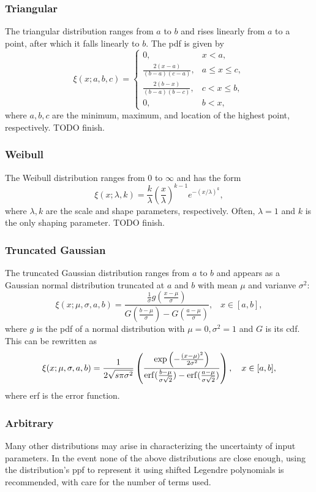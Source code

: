 \subsubsection{Triangular}
The triangular distribution ranges from $a$ to $b$ and rises linearly from $a$ to a point, after which it falls linearly to $b$.  The pdf is given by
\begin{equation}
\xi(x;a,b,c)=\begin{cases}
0, & x<a,\\
\frac{2(x-a)}{(b-a)(c-a)}, & a\leq x \leq c,\\
\frac{2(b-x)}{(b-a)(b-c)}, & c<x\leq b,\\
0, & b<x,
\end{cases}
\end{equation}
where $a,b,c$ are the minimum, maximum, and location of the highest point, respectively. TODO finish.

\subsubsection{Weibull}
The Weibull distribution ranges from 0 to $\infty$ and has the form
\begin{equation}
\xi(x;\lambda,k)=\frac{k}{\lambda}\left(\frac{x}{\lambda}\right)^{k-1}e^{-(x/\lambda)^k},
\end{equation}
where $\lambda,k$ are the scale and shape parameters, respectively.  Often, $\lambda=1$ and $k$ is the only shaping parameter. TODO finish.

\subsubsection{Truncated Gaussian}
The truncated Gaussian distribution ranges from $a$ to $b$ and appears as a Gaussian normal distribution truncated at $a$ and $b$ with mean $\mu$ and varianve $\sigma^2$:
\begin{equation}
\xi(x;\mu,\sigma,a,b)=\frac{\frac{1}{\sigma}g(\frac{x-\mu}{\sigma})}{G(\frac{b-\mu}{\sigma})-G(\frac{a-\mu}{\sigma})},
    \hspace{10pt} x\in[a,b],
\end{equation}
where $g$ is the pdf of a normal distribution with $\mu=0,\sigma^2=1$ and $G$ is its cdf.  This can be rewritten as
\begin{equation}
\xi(x;\mu,\sigma,a,b)=\frac{1}{2\sqrt{s\pi\sigma^2}}\left(
\frac{\exp\left(-\frac{(x-\mu)^2}{2\sigma^2}\right)}{\operatorname{erf}(\frac{b-\mu}{\sigma\sqrt{2}})-\operatorname{erf}(\frac{a-\mu}{\sigma\sqrt{2}})}
\right),\hspace{10pt} x\in[a,b],
\end{equation}
where erf is the error function.

\subsubsection{Arbitrary}
Many other distributions may arise in characterizing the uncertainty of input parameters.  In the event none of the above distributions are close enough, using the distribution's ppf to represent it using shifted Legendre polynomials is recommended, with care for the number of terms used.